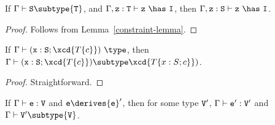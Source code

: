 \begin{lemma}
\label{has-lemma} %
If   $\Gamma \vdash {\tt S} \subtype {\tt T}$,
and  $\Gamma, {\tt z}: {\tt T} \vdash {\tt z}\ \has\ {\tt I}$,
then $\Gamma, {\tt z}: {\tt S} \vdash {\tt z}\ \has\ {\tt I}$.
\end{lemma}

\begin{proof}
Follows from Lemma~\ref{constraint-lemma}.
\end{proof}

\begin{lemma}\label{existslemma}
If 
$\Gamma \vdash ({\tt x}: {\tt S}; \xcd{T\{c\}})\ \type$, then
$\Gamma \vdash ({\tt x}: {\tt S}; \xcd{T\{c\}}) \subtype \xcd{T\{x: S; c\}})$.
\end{lemma}

\begin{proof}
Straightforward.
\end{proof}


\begin{theorem} 
\label{preservation}
If $\Gamma \vdash {\tt e}: {\tt V}$ and ${\tt e} \derives {\tt e}'$, then for some type ${\tt V}'$,
$\Gamma \vdash {\tt e}': {\tt V}'$ and $\Gamma \vdash {\tt V}' \subtype {\tt V}$.
\end{theorem}

